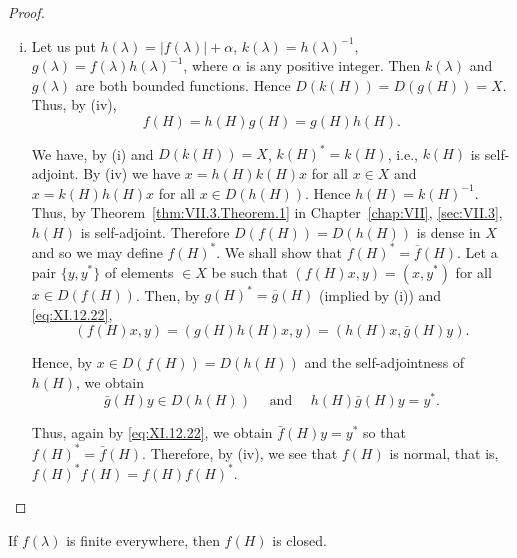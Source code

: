 \begin{proof}
\begin{enumerate}[(i)]
Since the above calculation may be traced conversely, we see that, under the hypothesis $x \in D(f(H))$, the two conditions $f(H)$ $x \in D(g(H))$ and $x \in D(f \cdot g(H))$ are equivalent and we have 
\[
\begin{aligned}
&(g (H) f (H) x, y)  = \int_{- \infty} ^{\infty} g (\lambda) \dd (E (\lambda) f (H) x, y) = \int_{- \infty} ^{\infty} g (\lambda) \dd \left(\int_{- \infty} ^{\lambda} f (\mu) \dd (E (\mu) x, y)\right) \\
&= \int_{- \infty} ^{\infty} g (\lambda) f (\lambda) \dd (E (\lambda) x, y) = ((g \cdot f) (H) x, y).
\end{aligned}
\]
\item Let us put $h(\lambda)=|f(\lambda)|+\alpha$, $k(\lambda)=h(\lambda)^{-1}$, $g(\lambda)=f(\lambda)h(\lambda)^{-1}$, where $\alpha$ is any positive integer. Then $k(\lambda)$ and $g(\lambda)$ are both bounded functions. Hence $D(k(H))=D(g(H))=X$. Thus, by (iv), 
\begin{equation}\label{eq:XI.12.22}
f (H) = h (H) g (H) = g (H) h (H).
\end{equation}

We have, by (i) and $D(k(H)) = X$, $k(H)^* = k(H)$, i.e., $k(H)$ is self-adjoint. By (iv) we have $x = h(H)k(H)x$ for all $x \in X$ and $x = k(H)h(H)x$ for all $x \in D(h(H))$. Hence $h(H) = k(H)^{-1}$. Thus, by Theorem~\ref{thm:VII.3.Theorem.1} in Chapter~\ref{chap:VII}, \ref{sec:VII.3}, $h(H)$ is self-adjoint. Therefore $D(f(H)) = D(h(H))$ is dense in $X$ and so we may define $f(H)^*$. We shall show that $f(H)^* = \overline{f}(H)$. Let a pair $\{y, y^*\}$ of elements $\in X$ be such that $(f(H)x, y) = (x, y^*)$ for all $x \in D(f(H))$. Then, by $g(H)^* = \overline{g}(H)$ (implied by (i)) and \eqref{eq:XI.12.22}, 
\[
(f (H) x, y) = (g (H) h (H) x, y) = (h (H) x, \bar {g} (H) y).
\]

Hence, by $x \in D(f(H)) = D(h(H))$ and the self-adjointness of $h(H)$, we obtain 
\[
\bar {g} (H) y \in D (h (H)) \quad \text{ and } \quad h (H) \bar {g} (H) y = y ^{*}.
\]

Thus, again by \eqref{eq:XI.12.22}, we obtain $\bar{f}(H)y=y^{*}$ so that $f(H)^{*}=\bar{f}(H)$. Therefore, by (iv), we see that $f(H)$ is normal, that is, $f(H)^{*}f(H)=f(H)f(H)^{*}$. \qedhere
\end{enumerate}
\end{proof}

\begin{corollaryu} If $f(\lambda)$ is finite everywhere, then $f(H)$ is closed. 
\end{corollaryu}

